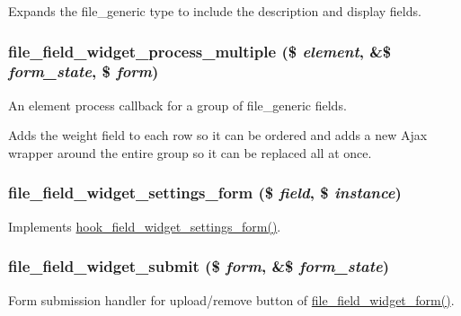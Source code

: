 Expands the file\_\-generic type to include the description and display fields. \hypertarget{file_8field_8inc_a4f8841b3519c2ead7100f1e74e129483}{
\subsubsection[{file\_\-field\_\-widget\_\-process\_\-multiple}]{\setlength{\rightskip}{0pt plus 5cm}file\_\-field\_\-widget\_\-process\_\-multiple (\$ {\em element}, \/  \&\$ {\em form\_\-state}, \/  \$ {\em form})}}
\label{file_8field_8inc_a4f8841b3519c2ead7100f1e74e129483}
An element process callback for a group of file\_\-generic fields.

Adds the weight field to each row so it can be ordered and adds a new Ajax wrapper around the entire group so it can be replaced all at once. \hypertarget{file_8field_8inc_a2853c788d6a2b924d8bd387c948fb25c}{
\subsubsection[{file\_\-field\_\-widget\_\-settings\_\-form}]{\setlength{\rightskip}{0pt plus 5cm}file\_\-field\_\-widget\_\-settings\_\-form (\$ {\em field}, \/  \$ {\em instance})}}
\label{file_8field_8inc_a2853c788d6a2b924d8bd387c948fb25c}
Implements \hyperlink{group__field__types_gabe5ece2134d0cbdfc3c4793f24c5866c}{hook\_\-field\_\-widget\_\-settings\_\-form()}. \hypertarget{file_8field_8inc_a058cf6245fc80b300ae30152fb98f33f}{
\subsubsection[{file\_\-field\_\-widget\_\-submit}]{\setlength{\rightskip}{0pt plus 5cm}file\_\-field\_\-widget\_\-submit (\$ {\em form}, \/  \&\$ {\em form\_\-state})}}
\label{file_8field_8inc_a058cf6245fc80b300ae30152fb98f33f}
Form submission handler for upload/remove button of \hyperlink{file_8field_8inc_a83f270ff3895b6a02c1c7cdcbffcd03f}{file\_\-field\_\-widget\_\-form()}.

